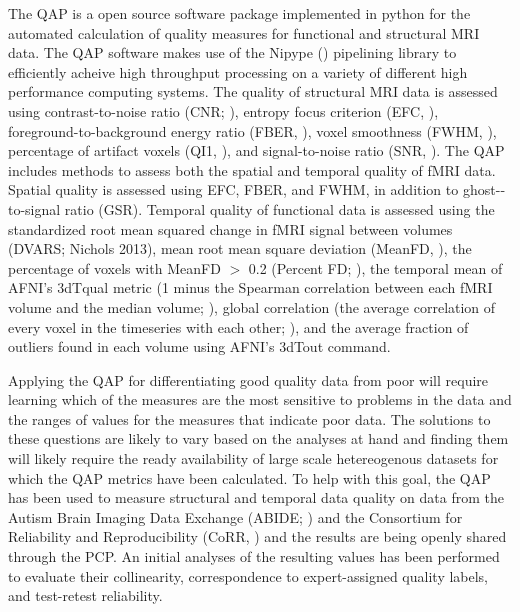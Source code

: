 \documentclass{frontiersSCNS} %
\begin{document}
The QAP is a open source software package implemented in python for the automated calculation of quality measures for functional and structural MRI data. The QAP software makes use of the Nipype (\cite{gorgolewski2011}) pipelining library to efficiently acheive high throughput processing on a variety of different high performance computing systems. The quality of structural MRI data is assessed using contrast-­to-­noise ratio (CNR; \cite{magnotta2006}), entropy focus criterion (EFC, \cite{atkinson1997}), foreground-­to-­background energy ratio (FBER, ), voxel smoothness (FWHM, \cite{friedman2008}), percentage of artifact voxels (QI1, \cite{mortamet2009}), and signal­-to-­noise ratio (SNR, \cite{magnotta2006}). The QAP includes methods to assess both the spatial and temporal quality of fMRI data. Spatial quality is assessed using EFC, FBER, and FWHM, in addition to ghost-­to-­signal ratio (GSR). Temporal quality of functional data is assessed using the standardized root mean squared change in fMRI signal between volumes (DVARS; Nichols 2013), mean root mean square deviation (MeanFD, \cite{jenkinson2002}), the percentage of voxels with MeanFD $>$ 0.2 (Percent FD; \cite{power2012}), the temporal mean of AFNI’s 3dTqual metric (1 minus the Spearman correlation between each fMRI volume and the median volume; \cite{cox1996}), global correlation (the average correlation of every voxel in the timeseries with each other; \cite{saad2013}), and the average fraction of outliers found in each volume using AFNI’s 3dTout command.

Applying the QAP for differentiating good quality data from poor will require learning which of the measures are the most sensitive to problems in the data and the ranges of values for the measures that indicate poor data. The solutions to these questions are likely to vary based on the analyses at hand and finding them will likely require the ready availability of large scale hetereogenous datasets for which the QAP metrics have been calculated. To help with this goal, the QAP has been used to measure structural and temporal data quality on data from the Autism Brain Imaging Data Exchange (ABIDE; \cite{dimartino2014}) and the Consortium for Reliability and Reproducibility (CoRR, \cite{zuo2014}) and the results are being openly shared through the PCP. An initial analyses of the resulting values has been performed to evaluate their collinearity, correspondence to expert­-assigned quality labels, and test­-retest reliability.
\end{document}
